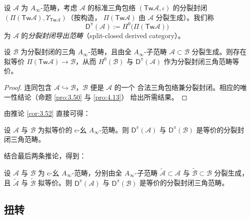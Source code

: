 \begin{Def}\label{def:4.16}
设 $\mathcal A$ 为 $A_\infty$-范畴，考虑 $\mathcal A$ 的标准三角包络
$(\mathsf{Tw}\mathcal A,\iota)$ 的分裂封闭
$(\Pi(\mathsf{Tw}\mathcal A),\Upsilon_{\mathsf{Tw}\mathcal A})$（按构造，
$\Pi(\mathsf{Tw}\mathcal A)$ 由 $\mathcal A$ 分裂生成）。我们称
\[
  \mathsf D^\pi(\mathcal A):=H^0\bigl(\Pi(\mathsf{Tw}\mathcal A)\bigr)
\]
为 $\mathcal A$ 的\emph{分裂封闭导出范畴}（split-closed derived category）。
\end{Def}

\begin{Cor}\label{cor:4.17}
设 $\mathcal B$ 为分裂封闭的三角 $A_\infty$-范畴，且由全 $A_\infty$-子范畴
$\mathcal A\subset\mathcal B$ 分裂生成。则存在拟等价
$\Pi(\mathsf{Tw}\mathcal A)\to\mathcal B$，从而 $H^0(\mathcal B)$ 与
$\mathsf D^\pi(\mathcal A)$ 作为分裂封闭三角范畴等价。
\end{Cor}

\begin{proof}
连同包含 $\mathcal A\hookrightarrow\mathcal B$，$\mathcal B$ 便是 $\mathcal A$ 的一个
合法三角包络兼分裂封闭。相应的唯一性结论（命题 \ref{pro:3.50} 与 \ref{pro:4.13}）
给出所需结果。
\end{proof}

由推论 \ref{cor:3.52} 直接可得：

\begin{Cor}\label{cor:4.18}
设 $\mathcal A$ 与 $\mathcal B$ 为拟等价的 c-幺 $A_\infty$-范畴。则
$\mathsf D^\pi(\mathcal A)$ 与 $\mathsf D^\pi(\mathcal B)$ 是等价的分裂封闭三角范畴。
\end{Cor}

结合最后两条推论，得到：

\begin{Cor}\label{cor:4.19}
设 $\mathcal A$ 与 $\mathcal B$ 为 c-幺 $A_\infty$-范畴，分别由全 $A_\infty$-子范畴
$\widetilde{\mathcal A}\subset\mathcal A$ 与 $\widetilde{\mathcal B}\subset\mathcal B$
分裂生成，且 $\widetilde{\mathcal A}$ 与 $\widetilde{\mathcal B}$ 拟等价。则
$\mathsf D^\pi(\mathcal A)$ 与 $\mathsf D^\pi(\mathcal B)$ 是等价的分裂封闭三角范畴。
\end{Cor}

\subsection{扭转}\label{sec:4.4}

